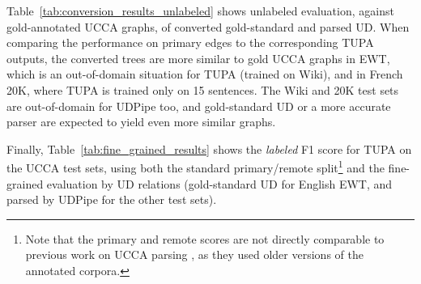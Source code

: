 \documentclass[11pt,a4paper]{article}
\begin{document}
Table~\ref{tab:conversion_results_unlabeled} shows unlabeled evaluation,
against gold-annotated UCCA graphs, of converted gold-standard and parsed UD.
When comparing the performance on primary edges to the corresponding TUPA outputs,
the converted trees are more similar to gold UCCA graphs
in EWT, which is an out-of-domain situation for TUPA (trained on Wiki),
and in French 20K, where TUPA is trained only on 15 sentences.
The Wiki and 20K test sets are out-of-domain for UDPipe too,
and gold-standard UD or a more accurate parser are expected to yield even more similar graphs.

Finally, Table~\ref{tab:fine_grained_results} shows the \textit{labeled} F1 score for TUPA
on the UCCA test sets,
using both the standard primary/remote
split\footnote{Note that the primary and remote scores are not directly comparable to previous work
on UCCA parsing \cite{hershcovich2017a,hershcovich2018multitask},
as they used older versions of the annotated corpora.}
and the fine-grained evaluation by UD relations
(gold-standard UD for English EWT, and parsed by UDPipe for the other test sets).
\end{document}
